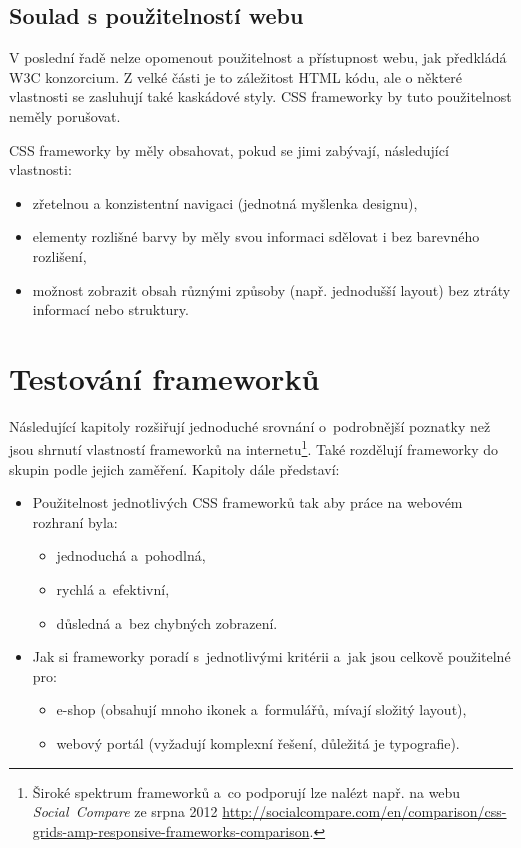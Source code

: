 \documentclass[thesis=B,czech]{FITthesis}[2012/06/26]
\begin{document}
\section{Soulad s použitelností webu}

V poslední řadě nelze opomenout použitelnost a přístupnost webu, jak předkládá W3C konzorcium. Z velké části je to záležitost HTML kódu, ale o některé vlastnosti se zasluhují také kaskádové styly. CSS frameworky by tuto použitelnost neměly porušovat. 

CSS frameworky by měly obsahovat, pokud se jimi zabývají, následující vlastnosti:
\begin{itemize}
 	\item zřetelnou a konzistentní navigaci (jednotná myšlenka designu),
 	\item elementy rozlišné barvy by měly svou informaci sdělovat i bez barevného rozlišení,
 	\item možnost zobrazit obsah různými způsoby (např. jednodušší layout) bez ztráty informací nebo struktury.\cite{wcag}
\end{itemize}


\chapter{Testování frameworků}
Následující kapitoly rozšiřují jednoduché srovnání o~podrobnější poznatky než jsou shrnutí vlastností frameworků na internetu\footnote{Široké spektrum frameworků a~co podporují lze nalézt např. na webu \textit{Social~Compare} ze srpna 2012 \url{http://socialcompare.com/en/comparison/css-grids-amp-responsive-frameworks-comparison}.}. Také rozdělují frameworky  do skupin podle jejich zaměření. 
Kapitoly dále představí:

\begin{itemize}
  \item Použitelnost jednotlivých CSS frameworků tak aby práce na webovém rozhraní byla:
	\begin{itemize}
 	\item jednoduchá a~pohodlná,
 	\item rychlá a~efektivní,
 	\item důsledná a~bez chybných zobrazení.
	\end{itemize}

 \item Jak si frameworky poradí s~jednotlivými kritérii a~jak jsou celkově použitelné pro:

\begin{itemize}
 \item e-shop (obsahují mnoho ikonek a~formulářů, mívají složitý layout),
 \item webový portál (vyžadují komplexní řešení, důležitá je typografie).
\end{itemize}
\end{itemize}
\end{document}
